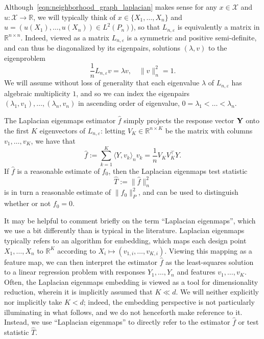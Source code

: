 \documentclass{article}
\newcommand{\Reals}{\mathbb{R}}
\newcommand{\1}{\mathbf{1}}
\newcommand{\Leb}{L}
\newcommand{\mc}[1]{\mathcal{#1}}
\newcommand{\dotp}[2]{\langle #1, #2 \rangle}
\newcommand{\wh}[1]{\widehat{#1}}
\theoremstyle{alden}
\theoremstyle{aldenthm}
\theoremstyle{definition}
\theoremstyle{remark}
\begin{document}
Although~\eqref{eqn:neighborhood_graph_laplacian} makes sense for any $x \in \mc{X}$ and $u: \mc{X} \to \Reals$, we will typically think of $x \in \{X_1,\ldots,X_n\}$ and $u = (u(X_1),\ldots,u(X_n)) \in \Leb^2(P_n)$), so that $L_{n,\varepsilon}$ is equivalently a matrix in $\Reals^{n \times n}$. Indeed, viewed as a matrix $L_{n,\varepsilon}$ is a symmetric and positive semi-definite, and can thus be diagonalized by its eigenpairs, solutions $(\lambda,v)$ to the eigenproblem
\begin{equation*}
\frac{1}{n}L_{n,\varepsilon}v = \lambda v, \quad \|v\|_n^2 = 1.
\end{equation*}
We will assume without loss of generality that each eigenvalue $\lambda$ of $L_{n,\varepsilon}$ has algebraic multiplicity $1$, and so we can index the eigenpairs $(\lambda_1,v_1),\ldots,(\lambda_n,v_n)$ in ascending order of eigenvalue, $0 = \lambda_1 < \ldots < \lambda_n$. 

The Laplacian eigenmaps estimator $\wh{f}$ simply projects the response vector ${\bf Y}$ onto the first $K$ eigenvectors of $L_{n,\varepsilon}$: letting $V_K \in \Reals^{n \times K}$ be the matrix with columns $v_1,\ldots,v_K$, we have that
\begin{equation}
\label{eqn:laplacian_eigenmaps_estimator}
\wh{f} := \sum_{k = 1}^{K} \dotp{Y}{v_k}_{n} v_k = \frac{1}{n} V_K V_K^{\top} Y.
\end{equation} 
If $\wh{f}$ is a reasonable estimate of $f_0$, then the Laplacian eigenmaps test statistic
\begin{equation}
\label{eqn:laplacian_eigenmaps_test}
\wh{T} := \|\wh{f}\|_n^2
\end{equation}
is in turn a reasonable estimate of $\|f_0\|_{P}^2$, and can be used to distinguish whether or not $f_0 = 0$.

It may be helpful to comment briefly on the term ``Laplacian eigenmaps'', which we use a bit differently than is typical in the literature. Laplacian eigenmaps typically refers to an algorithm for embedding, which maps each design point $X_1,\ldots,X_n$ to $\Reals^K$ according to $X_i \mapsto (v_{1,i}, \ldots, v_{K,i})$. Viewing this mapping as a feature map, we can then interpret the estimator $\wh{f}$ as the least-squares solution to a linear regression problem with responses $Y_1,\ldots,Y_n$ and features $v_1,\ldots,v_K$. Often, the Laplacian eigenmaps embedding is viewed as a tool for dimensionality reduction, wherein it is implicitly assumed that $K \ll d$. We will neither explicitly nor implicitly take $K < d$; indeed, the embedding perspective is not particularly illuminating in what follows, and we do not henceforth make reference to it. Instead, we use ``Laplacian eigenmaps'' to directly refer to the estimator $\wh{f}$ or test statistic $\wh{T}$. 
\end{document}
